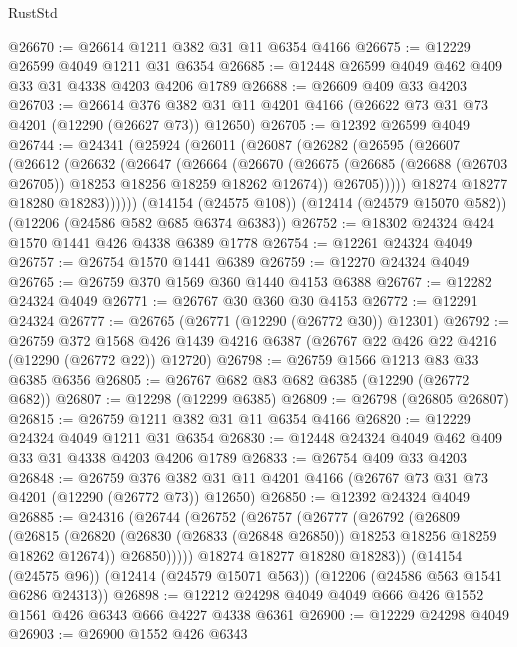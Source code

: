 \begin{lexlean}{RustStd}
\begin{coremodule}
{\begin{coremodule}
{{{{{{{{{{{{{{{{{{{{{{{{{{{{{{{{{{{{{{{{{{{{{{{{{{@26670 := @26614 @1211 @382 @31 @11 @6354 @4166
@26675 := @12229 @26599 @4049 @1211 @31 @6354
@26685 := @12448 @26599 @4049 @462 @409 @33 @31 @4338 @4203 @4206 @1789
@26688 := @26609 @409 @33 @4203
@26703 := @26614
    @376
    @382
    @31
    @11
    @4201
    @4166
    (@26622 @73 @31 @73 @4201 (@12290 (@26627 @73)) @12650)
@26705 := @12392 @26599 @4049
@26744 := @24341
    (@25924
      (@26011
        (@26087
          (@26282
            (@26595
              (@26607
                (@26612
                  (@26632
                    (@26647
                      (@26664
                        (@26670
                          (@26675
                            (@26685 (@26688 (@26703 @26705)) @18253 @18256 @18259 @18262 @12674))
                          @26705)))))
                @18274
                @18277
                @18280
                @18283))))))
    (@14154 (@24575 @108))
    (@12414 (@24579 @15070 @582))
    (@12206 (@24586 @582 @685 @6374 @6383))
@26752 := @18302 @24324 @424 @1570 @1441 @426 @4338 @6389 @1778
@26754 := @12261 @24324 @4049
@26757 := @26754 @1570 @1441 @6389
@26759 := @12270 @24324 @4049
@26765 := @26759 @370 @1569 @360 @1440 @4153 @6388
@26767 := @12282 @24324 @4049
@26771 := @26767 @30 @360 @30 @4153
@26772 := @12291 @24324
@26777 := @26765 (@26771 (@12290 (@26772 @30)) @12301)
@26792 := @26759
    @372
    @1568
    @426
    @1439
    @4216
    @6387
    (@26767 @22 @426 @22 @4216 (@12290 (@26772 @22)) @12720)
@26798 := @26759 @1566 @1213 @83 @33 @6385 @6356
@26805 := @26767 @682 @83 @682 @6385 (@12290 (@26772 @682))
@26807 := @12298 (@12299 @6385)
@26809 := @26798 (@26805 @26807)
@26815 := @26759 @1211 @382 @31 @11 @6354 @4166
@26820 := @12229 @24324 @4049 @1211 @31 @6354
@26830 := @12448 @24324 @4049 @462 @409 @33 @31 @4338 @4203 @4206 @1789
@26833 := @26754 @409 @33 @4203
@26848 := @26759
    @376
    @382
    @31
    @11
    @4201
    @4166
    (@26767 @73 @31 @73 @4201 (@12290 (@26772 @73)) @12650)
@26850 := @12392 @24324 @4049
@26885 := @24316
    (@26744
      (@26752
        (@26757
          (@26777
            (@26792
              (@26809
                (@26815
                  (@26820 (@26830 (@26833 (@26848 @26850)) @18253 @18256 @18259 @18262 @12674))
                  @26850)))))
        @18274
        @18277
        @18280
        @18283))
    (@14154 (@24575 @96))
    (@12414 (@24579 @15071 @563))
    (@12206 (@24586 @563 @1541 @6286 @24313))
@26898 := @12212 @24298 @4049 @4049 @666 @426 @1552 @1561 @426 @6343 @666 @4227 @4338 @6361
@26900 := @12229 @24298 @4049
@26903 := @26900 @1552 @426 @6343
}}}}}}}}}}}}}}}}}}}}}}}}}}}}}}}}}}}}}}}}}}}}}}}}}}
\end{coremodule}}
\end{coremodule}
\end{lexlean}
